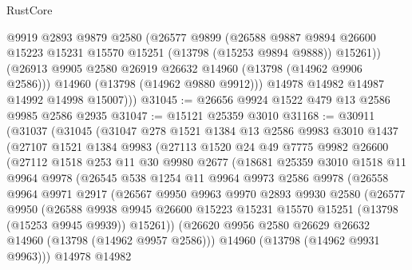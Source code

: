 \begin{lexlean}{RustCore}
\begin{coremodule}
            @9919
            @2893
            @9879
            @2580
            (@26577
              @9899
              (@26588
                @9887
                @9894
                @26600
                @15223
                @15231
                @15570
                @15251
                (@13798 (@15253 @9894 @9888))
                @15261))
            (@26913 @9905 @2580 @26919 @26632 @14960 (@13798 (@14962 @9906 @2586)))
            @14960
            (@13798 (@14962 @9880 @9912)))
          @14978
          @14982
          @14987
          @14992
          @14998
          @15007)))
@31045 := @26656 @9924 @1522 @479 @13 @2586 @9985 @2586 @2935
@31047 := @15121 @25359 @3010
@31168 := @30911
    (@31037
      (@31045
        (@31047
          @278
          @1521
          @1384
          @13
          @2586
          @9983
          @3010
          @1437
          (@27107
            @1521
            @1384
            @9983
            (@27113
              @1520
              @24
              @49
              @7775
              @9982
              @26600
              (@27112
                @1518
                @253
                @11
                @30
                @9980
                @2677
                (@18681
                  @25359
                  @3010
                  @1518
                  @11
                  @9964
                  @9978
                  (@26545
                    @538
                    @1254
                    @11
                    @9964
                    @9973
                    @2586
                    @9978
                    (@26558
                      @9964
                      @9971
                      @2917
                      (@26567
                        @9950
                        @9963
                        @9970
                        @2893
                        @9930
                        @2580
                        (@26577
                          @9950
                          (@26588
                            @9938
                            @9945
                            @26600
                            @15223
                            @15231
                            @15570
                            @15251
                            (@13798 (@15253 @9945 @9939))
                            @15261))
                        (@26620 @9956 @2580 @26629 @26632 @14960 (@13798 (@14962 @9957 @2586)))
                        @14960
                        (@13798 (@14962 @9931 @9963)))
                      @14978
                      @14982

\end{coremodule}
\end{lexlean}
